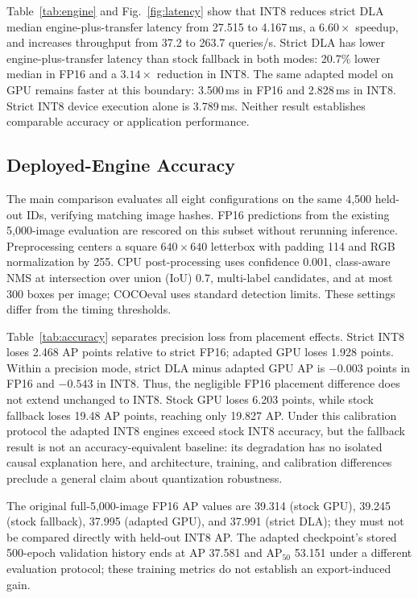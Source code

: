 Table~\ref{tab:engine} and Fig.~\ref{fig:latency} show that INT8 reduces strict DLA
median engine-plus-transfer latency from 27.515 to 4.167\,ms, a $6.60\times$ speedup, and increases
throughput from 37.2 to 263.7 queries/s. Strict DLA has lower
engine-plus-transfer latency than stock fallback in both modes: 20.7\% lower
median in FP16 and a $3.14\times$ reduction in INT8. The same adapted model on
GPU remains faster at this boundary: 3.500\,ms in FP16 and 2.828\,ms in INT8. Strict INT8 device execution alone
is 3.789\,ms. Neither result establishes comparable accuracy or application
performance.

\subsection{Deployed-Engine Accuracy}
\label{sec:accuracy}
The main comparison evaluates all eight configurations on the same 4,500
held-out IDs, verifying matching image hashes. FP16 predictions from the
existing 5,000-image evaluation are rescored on this subset without rerunning
inference. Preprocessing centers a square $640\times640$ letterbox with padding
114 and RGB normalization by 255. CPU post-processing uses confidence 0.001,
class-aware NMS at intersection over union (IoU) 0.7, multi-label candidates,
and at most 300 boxes per image; COCOeval uses standard detection limits.
These settings differ from the timing thresholds.


Table~\ref{tab:accuracy} separates precision loss from placement effects.
Strict INT8 loses 2.468 AP points relative to strict FP16; adapted GPU loses
1.928 points. Within a precision mode, strict DLA minus adapted GPU AP is
$-0.003$ points in FP16 and $-0.543$ in INT8. Thus, the negligible FP16
placement difference does not extend unchanged to INT8.
Stock GPU loses 6.203 points, while stock fallback loses 19.48 AP points,
reaching only 19.827 AP. Under this calibration protocol the adapted INT8
engines exceed stock INT8 accuracy, but the fallback result is not an
accuracy-equivalent baseline: its degradation has no isolated causal
explanation here, and architecture, training, and calibration differences
preclude a general claim about quantization robustness.

The original full-5,000-image FP16 AP values are 39.314 (stock GPU), 39.245
(stock fallback), 37.995 (adapted GPU), and 37.991 (strict DLA); they must not
be compared directly with held-out INT8 AP.
The adapted checkpoint's stored 500-epoch validation history ends at AP 37.581
and AP$_{50}$ 53.151 under a different evaluation protocol; these training
metrics do not establish an export-induced gain.

